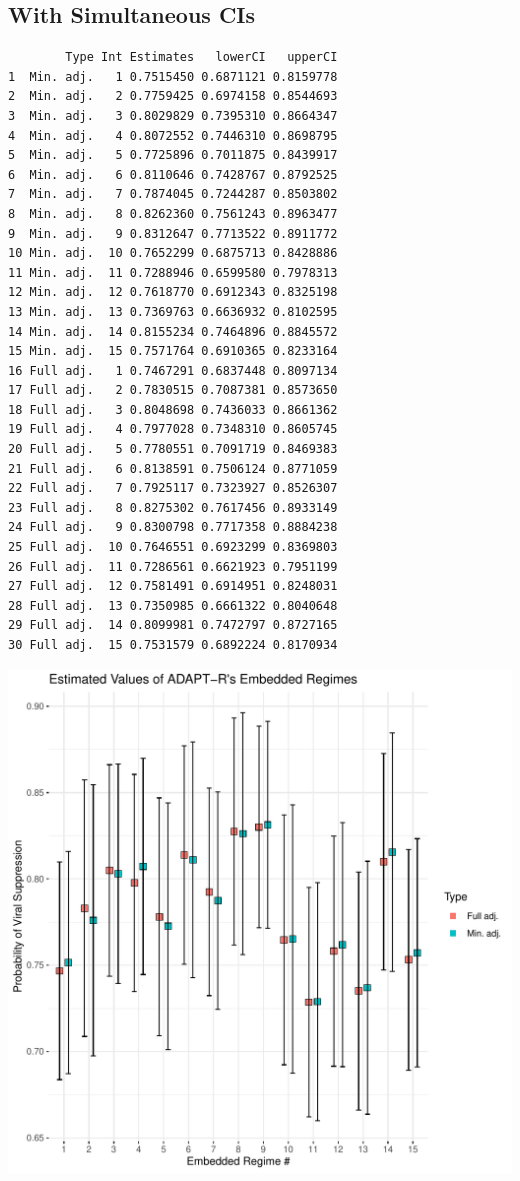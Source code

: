 \documentclass[11pt]{article}\usepackage[]{graphicx}\usepackage[]{color}
\makeatletter
\def\maxwidth{ %
  \ifdim\Gin@nat@width>\linewidth
    \linewidth
  \else
    \Gin@nat@width
  \fi
}
\newenvironment{kframe}{%
 \def\at@end@of@kframe{}%
 \ifinner\ifhmode%
  \def\at@end@of@kframe{\end{minipage}}%
  \begin{minipage}{\columnwidth}%
 \fi\fi%
 \def\FrameCommand##1{\hskip\@totalleftmargin \hskip-\fboxsep
 \colorbox{shadecolor}{##1}\hskip-\fboxsep
     \hskip-\linewidth \hskip-\@totalleftmargin \hskip\columnwidth}%
 \MakeFramed {\advance\hsize-\width
   \@totalleftmargin\z@ \linewidth\hsize
   \@setminipage}}%
 {\par\unskip\endMakeFramed%
 \at@end@of@kframe}
\newenvironment{knitrout}{}{} %
\makeatother
\begin{document}
\subsection{With Simultaneous CIs}
\begin{knitrout}
\color{fgcolor}\begin{kframe}
\begin{verbatim}
        Type Int Estimates   lowerCI   upperCI
1  Min. adj.   1 0.7515450 0.6871121 0.8159778
2  Min. adj.   2 0.7759425 0.6974158 0.8544693
3  Min. adj.   3 0.8029829 0.7395310 0.8664347
4  Min. adj.   4 0.8072552 0.7446310 0.8698795
5  Min. adj.   5 0.7725896 0.7011875 0.8439917
6  Min. adj.   6 0.8110646 0.7428767 0.8792525
7  Min. adj.   7 0.7874045 0.7244287 0.8503802
8  Min. adj.   8 0.8262360 0.7561243 0.8963477
9  Min. adj.   9 0.8312647 0.7713522 0.8911772
10 Min. adj.  10 0.7652299 0.6875713 0.8428886
11 Min. adj.  11 0.7288946 0.6599580 0.7978313
12 Min. adj.  12 0.7618770 0.6912343 0.8325198
13 Min. adj.  13 0.7369763 0.6636932 0.8102595
14 Min. adj.  14 0.8155234 0.7464896 0.8845572
15 Min. adj.  15 0.7571764 0.6910365 0.8233164
16 Full adj.   1 0.7467291 0.6837448 0.8097134
17 Full adj.   2 0.7830515 0.7087381 0.8573650
18 Full adj.   3 0.8048698 0.7436033 0.8661362
19 Full adj.   4 0.7977028 0.7348310 0.8605745
20 Full adj.   5 0.7780551 0.7091719 0.8469383
21 Full adj.   6 0.8138591 0.7506124 0.8771059
22 Full adj.   7 0.7925117 0.7323927 0.8526307
23 Full adj.   8 0.8275302 0.7617456 0.8933149
24 Full adj.   9 0.8300798 0.7717358 0.8884238
25 Full adj.  10 0.7646551 0.6923299 0.8369803
26 Full adj.  11 0.7286561 0.6621923 0.7951199
27 Full adj.  12 0.7581491 0.6914951 0.8248031
28 Full adj.  13 0.7350985 0.6661322 0.8040648
29 Full adj.  14 0.8099981 0.7472797 0.8727165
30 Full adj.  15 0.7531579 0.6892224 0.8170934
\end{verbatim}
\end{kframe}
\includegraphics[width=\maxwidth]{figure/unnamed-chunk-2-1} 

\end{knitrout}
\end{document}
